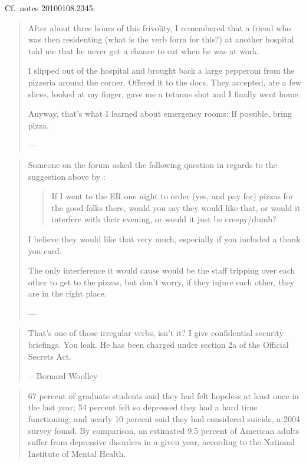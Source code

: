 \documentclass[a4paper]{article}
\begin{document}
\medskip
Cf.~notes 20100108.2345:
\begin{quote}
	After about three hours of this frivolity, I remembered that
	a friend who was then residenting (what is the verb form for
	this?) at another hospital told me that he never got a chance
	to eat when he was at work.

	I slipped out of the hospital and brought back a large pepperoni
	from the pizzeria around the corner. Offered it to the docs. They
	accepted, ate a few slices, looked at my finger, gave me a
	tetanus shot and I finally went home.

	Anyway, that's what I learned about emergency rooms: If possible,
	bring pizza.

	---\citet{MollyNY2006}
\end{quote}

\medskip
\begin{quote}
	Someone on the forum asked the following question in regards to
	the suggestion above by \citet{MollyNY2006}:
	\begin{quote}
		If I went to the ER one night to order (yes, and pay for) pizzas
		for the good folks there, would you say they would like that,
		or would it interfere with their evening, or would it just
		be creepy/dumb?
	\end{quote}

	I believe they would like that very much, especially if you
	included a thank you card.

	The only interference it would cause would be the staff tripping
	over each other to get to the pizzas, but don't worry, if they
	injure each other, they are in the right place.

	---\citet{Taaki2006}
\end{quote}

\medskip
\begin{quote}
	That's one of those irregular verbs, isn't it?  I give
	confidential security briefings.  You leak.  He has been
	charged under section 2a of the Official Secrets Act. 

	---Bernard Woolley
\end{quote}

\medskip
\begin{quote}
	67 percent of graduate students said they had felt hopeless
	at least once in the last year; 54 percent felt so depressed
	they had a hard time functioning; and nearly 10 percent said
	they had considered suicide, a 2004 survey found. By comparison,
	an estimated 9.5 percent of American adults suffer from
	depressive disorders in a given year, according to the National
	Institute of Mental Health.~\citep{Fogg2009}
\end{quote}
\end{document}

